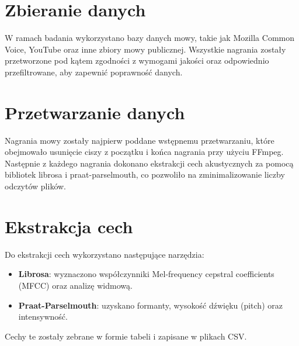 \section{Zbieranie danych}

W ramach badania wykorzystano bazy danych mowy, takie jak Mozilla Common Voice, YouTube oraz inne zbiory mowy publicznej. Wszystkie nagrania zostały przetworzone pod kątem zgodności z wymogami jakości oraz odpowiednio przefiltrowane, aby zapewnić poprawność danych.

\section{Przetwarzanie danych}

Nagrania mowy zostały najpierw poddane wstępnemu przetwarzaniu, które obejmowało usunięcie ciszy z początku i końca nagrania przy użyciu FFmpeg. Następnie z każdego nagrania dokonano ekstrakcji cech akustycznych za pomocą bibliotek librosa i praat-parselmouth, co pozwoliło na zminimalizowanie liczby odczytów plików.

\section{Ekstrakcja cech}

Do ekstrakcji cech wykorzystano następujące narzędzia:
\begin{itemize}
    \item \textbf{Librosa}: wyznaczono współczynniki Mel-frequency cepstral coefficients (MFCC) oraz analizę widmową.
    \item \textbf{Praat-Parselmouth}: uzyskano formanty, wysokość dźwięku (pitch) oraz intensywność.
\end{itemize}

Cechy te zostały zebrane w formie tabeli i zapisane w plikach CSV.
